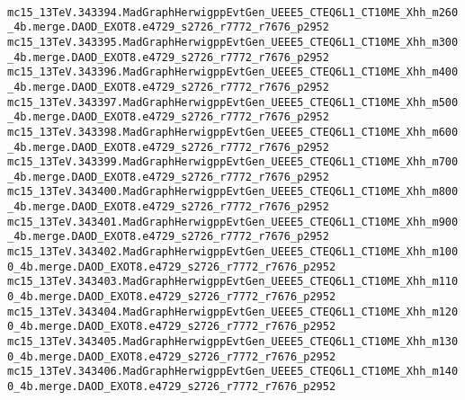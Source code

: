 \noindent
\\
{\tiny
\verb|mc15_13TeV.343394.MadGraphHerwigppEvtGen_UEEE5_CTEQ6L1_CT10ME_Xhh_m260_4b.merge.DAOD_EXOT8.e4729_s2726_r7772_r7676_p2952|\\
\verb|mc15_13TeV.343395.MadGraphHerwigppEvtGen_UEEE5_CTEQ6L1_CT10ME_Xhh_m300_4b.merge.DAOD_EXOT8.e4729_s2726_r7772_r7676_p2952|\\
\verb|mc15_13TeV.343396.MadGraphHerwigppEvtGen_UEEE5_CTEQ6L1_CT10ME_Xhh_m400_4b.merge.DAOD_EXOT8.e4729_s2726_r7772_r7676_p2952|\\
\verb|mc15_13TeV.343397.MadGraphHerwigppEvtGen_UEEE5_CTEQ6L1_CT10ME_Xhh_m500_4b.merge.DAOD_EXOT8.e4729_s2726_r7772_r7676_p2952|\\
\verb|mc15_13TeV.343398.MadGraphHerwigppEvtGen_UEEE5_CTEQ6L1_CT10ME_Xhh_m600_4b.merge.DAOD_EXOT8.e4729_s2726_r7772_r7676_p2952|\\
\verb|mc15_13TeV.343399.MadGraphHerwigppEvtGen_UEEE5_CTEQ6L1_CT10ME_Xhh_m700_4b.merge.DAOD_EXOT8.e4729_s2726_r7772_r7676_p2952|\\
\verb|mc15_13TeV.343400.MadGraphHerwigppEvtGen_UEEE5_CTEQ6L1_CT10ME_Xhh_m800_4b.merge.DAOD_EXOT8.e4729_s2726_r7772_r7676_p2952|\\
\verb|mc15_13TeV.343401.MadGraphHerwigppEvtGen_UEEE5_CTEQ6L1_CT10ME_Xhh_m900_4b.merge.DAOD_EXOT8.e4729_s2726_r7772_r7676_p2952|\\
\verb|mc15_13TeV.343402.MadGraphHerwigppEvtGen_UEEE5_CTEQ6L1_CT10ME_Xhh_m1000_4b.merge.DAOD_EXOT8.e4729_s2726_r7772_r7676_p2952|\\
\verb|mc15_13TeV.343403.MadGraphHerwigppEvtGen_UEEE5_CTEQ6L1_CT10ME_Xhh_m1100_4b.merge.DAOD_EXOT8.e4729_s2726_r7772_r7676_p2952|\\
\verb|mc15_13TeV.343404.MadGraphHerwigppEvtGen_UEEE5_CTEQ6L1_CT10ME_Xhh_m1200_4b.merge.DAOD_EXOT8.e4729_s2726_r7772_r7676_p2952|\\
\verb|mc15_13TeV.343405.MadGraphHerwigppEvtGen_UEEE5_CTEQ6L1_CT10ME_Xhh_m1300_4b.merge.DAOD_EXOT8.e4729_s2726_r7772_r7676_p2952|\\
\verb|mc15_13TeV.343406.MadGraphHerwigppEvtGen_UEEE5_CTEQ6L1_CT10ME_Xhh_m1400_4b.merge.DAOD_EXOT8.e4729_s2726_r7772_r7676_p2952|\\
}
